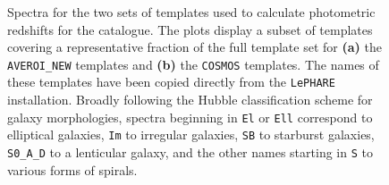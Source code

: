  \begin{figure}
\centering
{}

\caption[Galaxy template SEDs]{Spectra for the two sets of templates used to calculate photometric redshifts for the \DESVIDEO catalogue. The plots display a subset of templates covering a representative fraction of the full template set for \textbf{(a)} the \texttt{AVEROI\_NEW} templates and \textbf{(b)} the \texttt{COSMOS} templates. The names of these templates have been copied directly from the \texttt{LePHARE} installation. Broadly following the Hubble classification scheme for galaxy morphologies, spectra beginning in \texttt{El} or \texttt{Ell} correspond to elliptical galaxies, \texttt{Im} to irregular galaxies, \texttt{SB} to starburst galaxies, \texttt{S0\_A\_D} to a lenticular galaxy, and the other names starting in \texttt{S} to various forms of spirals.}
\label{fig:templates}
\end{figure}

